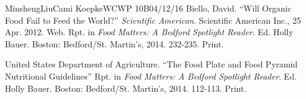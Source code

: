 \documentclass[12pt,letterpaper]{article}
\begin{document}
\begin{mla}{Minsheng}{Liu}{Cami Koepke}{WCWP 10B}{04/12/16}
\bibent Biello, David. ``Will Organic Food Fail to Feed the World?'' \textit{Scientific American}. Scientific American Inc., 25 Apr. 2012. Web. Rpt. in \textit{Food Matters: A Bedford Spotlight Reader}. Ed. Holly Bauer. Boston: Bedford/St. Martin's, 2014. 232-235. Print.

\bibent United States Department of Agriculture.
``The Food Plate and Food Pyramid Nutritional Guidelines''
Rpt. in \textit{Food Matters: A Bedford Spotlight Reader}.
Ed. Holly Bauer. Boston: Bedford/St. Martin's, 2014. 112-113. Print.

\end{mla}
\end{document}
